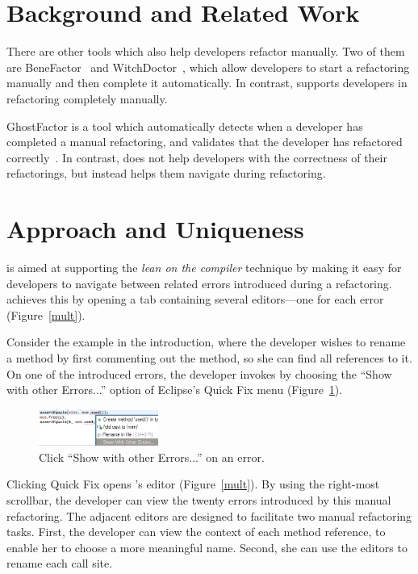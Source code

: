 \documentclass{sigplanconf}
\begin{document}
\section{Background and Related Work}
There are other tools which also help developers refactor manually. Two of them
are
BeneFactor~\cite{bene-factor} and WitchDoctor~\cite{witch-doctor},
which allow developers to start a refactoring manually and then
complete it automatically.
In contrast, \pname{} supports developers in refactoring completely manually.

GhostFactor is a tool which automatically detects
when a developer has completed a manual refactoring, and validates
that the developer has refactored correctly~\cite{ghost-factor}.
In contrast, \pname{} does not help developers with the correctness of
their refactorings, but instead helps them navigate during refactoring.

\section{Approach and Uniqueness}
\pname{} is aimed at supporting the \textit{lean on the compiler} technique
by making it easy for developers to navigate between related errors introduced
during a refactoring. \pname{} achieves this by opening a tab containing
several editors---one for each error (Figure~\ref{mult}).

Consider the example in the introduction, where the developer
wishes to rename a method by first commenting out
the method, so she can find all references to it.
On one of the introduced errors, the developer invokes \pname{} by choosing
the ``Show with other Errors...'' option of Eclipse's Quick Fix
menu (Figure~\ref{quick}).

\begin{figure}[h]
\begin{center}
\includegraphics[width=0.35\textwidth]{quick-fix.png}
\caption{Click ``Show with other Errors...'' on an error.\label{quick}}
\end{center}
\end{figure}

Clicking Quick Fix opens \pname{}'s editor (Figure~\ref{mult}). By using the
right-most scrollbar, the developer
can view the twenty errors introduced by this manual refactoring.
The adjacent editors are designed to facilitate two manual refactoring tasks.
First, the developer can view the context of each method reference, to enable
her to choose a more meaningful name. Second, she can use the editors to rename
each call site.
\end{document}
